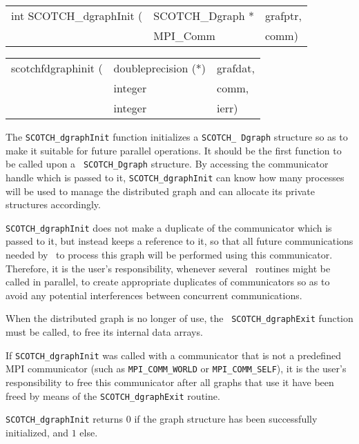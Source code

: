 \begin{itemize}
\progsyn

{\tt\begin{tabular}{l@{}ll}
int SCOTCH\_dgraphInit ( & SCOTCH\_Dgraph * & grafptr, \\
                         & MPI\_Comm        & comm)
\end{tabular}}

{\tt\begin{tabular}{l@{}ll}
scotchfdgraphinit ( & doubleprecision (*) & grafdat, \\
                    & integer             & comm, \\
                    & integer             & ierr)
\end{tabular}}

\progdes

The {\tt SCOTCH\_dgraphInit} function initializes a {\tt SCOTCH\_\lbt
Dgraph} structure so as to make it suitable for future parallel
operations. It should be the first function to be called upon a {\tt
SCOTCH\_\lbt Dgraph} structure. By accessing the communicator handle
which is passed to it, {\tt SCOTCH\_dgraphInit} can know how many
processes will be used to manage the distributed graph and can allocate
its private structures accordingly.

{\tt SCOTCH\_dgraphInit} does not make a duplicate of the communicator
which is passed to it, but instead keeps a reference to it, so that
all future communications needed by \libscotch\ to process this graph
will be performed using this communicator. Therefore, it is the user's
responsibility, whenever several \libscotch\ routines might be called
in parallel, to create appropriate duplicates of communicators so as
to avoid any potential interferences between concurrent
communications.

When the distributed graph is no longer of use, the {\tt
SCOTCH\_\lbt dgraph\lbt Exit} function must be called, to free
its internal data arrays.

If {\tt SCOTCH\_\lbt dgraph\lbt Init} was called with a
communicator that is not a predefined MPI communicator (such as
{\tt MPI\_\tt COMM\_\lbt WORLD} or {\tt MPI\_\tt COMM\_\lbt SELF}), it
is the user's responsibility to free this communicator after
all graphs that use it have been freed by means of the
{\tt SCOTCH\_\lbt dgraph\lbt Exit} routine.

\progret

{\tt SCOTCH\_dgraphInit} returns $0$ if the graph structure has been
successfully initialized, and $1$ else.
\end{itemize}

